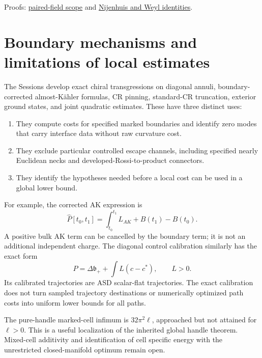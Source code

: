 \documentclass[
]{article}
\providecommand{\tightlist}{%
  \setlength{\itemsep}{0pt}\setlength{\parskip}{0pt}}
\begin{document}
Proofs:
\href{sources/Sessions/S1003A02/workspace/notes/step38_kahler_and_paired_field_scope.md}{paired-field
scope} and
\href{sources/Sessions/S1003A02/workspace/notes/step40_nijenhuis_form_and_pointwise_exhaustion.md}{Nijenhuis
and Weyl identities}.

\hypertarget{boundary-mechanisms-and-limitations-of-local-estimates}{%
\section{Boundary mechanisms and limitations of local
estimates}\label{boundary-mechanisms-and-limitations-of-local-estimates}}

The Sessions develop exact chiral transgressions on diagonal annuli,
boundary-corrected almost-Kähler formulas, CR pinning, standard-CR
truncation, exterior ground states, and joint quadratic estimates. These
have three distinct uses:

\begin{enumerate}
\def\labelenumi{\arabic{enumi}.}
\tightlist
\item
  They compute costs for specified marked boundaries and identify zero
  modes that carry interface data without raw curvature cost.
\item
  They exclude particular controlled escape channels, including
  specified nearly Euclidean necks and developed-Rossi-to-product
  connectors.
\item
  They identify the hypotheses needed before a local cost can be used in
  a global lower bound.
\end{enumerate}

For example, the corrected AK expression is \[
 \widehat P[t_0,t_1]=\int_{t_0}^{t_1}L_{AK}+B(t_1)-B(t_0).
\] A positive bulk AK term can be cancelled by the boundary term; it is
not an additional independent charge. The diagonal control calibration
similarly has the exact form \[
 \widehat P=\Delta\mathfrak b_++\int L(c-c^*),\qquad L>0.
\] Its calibrated trajectories are ASD scalar-flat trajectories. The
exact calibration does not turn sampled trajectory destinations or
numerically optimized path costs into uniform lower bounds for all
paths.

The pure-handle marked-cell infimum is \(32\pi^2\ell\), approached but
not attained for \(\ell>0\). This is a useful localization of the
inherited global handle theorem. Mixed-cell additivity and
identification of cell specific energy with the unrestricted
closed-manifold optimum remain open.
\end{document}

